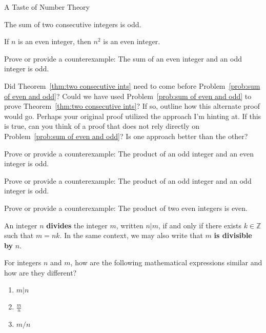 \begin{section}{A Taste of Number Theory}
\begin{theorem}\label{thm:two consecutive ints}
The sum of two consecutive integers is odd.
\end{theorem}

\begin{theorem}\label{thm:n even implies n^2 even}
If $n$ is an even integer, then $n^2$ is an even integer.
\end{theorem}

\begin{problem}\label{prob:sum of even and odd}
Prove or provide a counterexample:  The sum of an even integer and an odd integer is odd.
\end{problem}

\begin{question}
Did Theorem~\ref{thm:two consecutive ints} need to come before Problem~\ref{prob:sum of even and odd}?  Could we have used Problem~\ref{prob:sum of even and odd} to prove Theorem~\ref{thm:two consecutive ints}?  If so, outline how this alternate proof would go.  Perhaps your original proof utilized the approach I'm hinting at.  If this is true, can you think of a proof that does not rely directly on Problem~\ref{prob:sum of even and odd}?  Is one approach better than the other?
\end{question}

\begin{problem}
Prove or provide a counterexample: The product of an odd integer and an even integer is odd.
\end{problem}

\begin{problem}
Prove or provide a counterexample: The product of an odd integer and an odd integer is odd.
\end{problem}

\begin{problem}
Prove or provide a counterexample: The product of two even integers is even.
\end{problem}

\begin{definition}
An integer $n$ \textbf{divides} the integer $m$, written $n|m$, if and only if there exists $k\in\mathbb{Z}$ such that $m=nk$. In the same context, we may also write that $m$ \textbf{is divisible by} $n$.
\end{definition}

\begin{question}
For integers $n$ and $m$, how are the following mathematical expressions similar and how are they different?
\begin{enumerate}[label=\textrm{(\alph*)}]
\item $m|n$
\item $\displaystyle \frac{m}{n}$
\item $m/n$
\end{enumerate}
\end{question}


\end{section}
